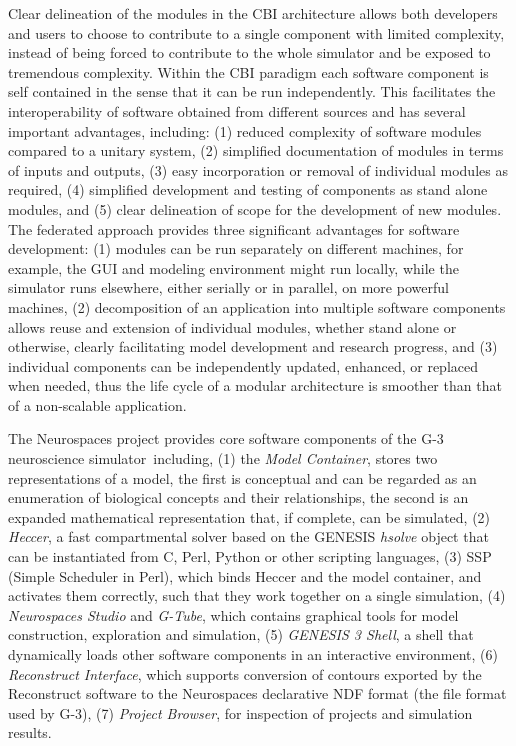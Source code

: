 \documentclass[12pt]{article}
\begin{document}
Clear delineation of the modules in the CBI architecture allows both
developers and users to choose to contribute to a single component
with limited complexity, instead of being forced to contribute to the
whole simulator and be exposed to tremendous complexity. Within the
CBI paradigm each software component is self contained in the sense
that it can be run independently. This facilitates the
interoperability of software obtained from different sources and has
several important advantages, including: (1) reduced complexity of
software modules compared to a unitary system, (2) simplified
documentation of modules in terms of inputs and outputs, (3) easy
incorporation or removal of individual modules as required, (4)
simplified development and testing of components as stand alone
modules, and (5) clear delineation of scope for the development of new
modules. The federated approach provides three significant advantages
for software development: (1) modules can be run separately on
different machines, for example, the GUI and modeling environment
might run locally, while the simulator runs elsewhere, either serially
or in parallel, on more powerful machines, (2) decomposition of an
application into multiple software components allows reuse and
extension of individual modules, whether stand alone or otherwise,
clearly facilitating model development and research progress, and (3)
individual components can be independently updated, enhanced, or
replaced when needed, thus the life cycle of a modular architecture is
smoother than that of a non-scalable application.

The Neurospaces project provides core software components of the G-3
neuroscience simulator\,\cite{cornelis03:_neuros} including, (1) the
{\it Model Container}, stores two representations of a model, the
first is conceptual and can be regarded as an enumeration of
biological concepts and their relationships, the second is an expanded
mathematical representation that, if complete, can be simulated, (2)
{\it Heccer}, a fast compartmental solver based on the GENESIS {\it
  hsolve} object that can be instantiated from C, Perl, Python or
other scripting languages, (3) SSP (Simple Scheduler in Perl), which
binds Heccer and the model container, and activates them correctly,
such that they work together on a single simulation, (4) {\it
  Neurospaces Studio} and {\it G-Tube}, which contains graphical tools
for model construction, exploration and simulation, (5) {\it GENESIS 3
  Shell}, a shell that dynamically loads other software components in
an interactive environment, (6) {\it Reconstruct Interface}, which
supports conversion of contours exported by the Reconstruct software
to the Neurospaces declarative NDF format (the file format used by
G-3), (7) {\it Project Browser}, for inspection of projects and
simulation results.
\end{document}
